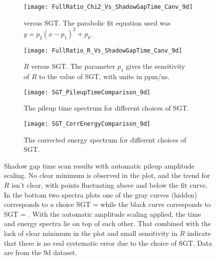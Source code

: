 \begin{figure}
\centering
    \begin{subfigure}[t]{0.45\textwidth}
        \centering
        \texttt{[image: FullRatio\_Chi2\_Vs\_ShadowGapTime\_Canv\_9d]}
        \caption{\chisq versus SGT. The parabolic fit equation used was $y = p_{2}(x - p_{1})^{2} + p_{0}.$}
    \end{subfigure}%
    \hspace{1cm}
    \begin{subfigure}[t]{0.45\textwidth}
        \centering
        \texttt{[image: FullRatio\_R\_Vs\_ShadowGapTime\_Canv\_9d]}
        \caption{$R$ versus SGT. The parameter $p_{1}$ gives the sensitivity of $R$ to the value of SGT, with units in ppm/ns.}
    \end{subfigure}

    \begin{subfigure}[t]{0.45\textwidth}
        \centering
        \texttt{[image: SGT\_PileupTimeComparison\_9d]}
        \caption{The pileup time spectrum for different choices of SGT.}
    \end{subfigure}%
    \hspace{1cm}
    \begin{subfigure}[t]{0.45\textwidth}
        \centering
        \texttt{[image: SGT\_CorrEnergyComparison\_9d]}
        \caption{The corrected energy spectrum for different choices of SGT.}
    \end{subfigure}
\caption[Pileup shadow gap time scan with automatic pileup amplitude scaling]{Shadow gap time scan results with automatic pileup amplitude scaling. No clear minimum is observed in the \chisq plot, and the trend for $R$ isn't clear, with points fluctuating above and below the fit curve. In the bottom two spectra plots one of the gray curves (hidden) corresponds to a choice SGT =  while the black curve corresponds to SGT = . With the automatic amplitude scaling applied, the time and energy spectra lie on top of each other. That combined with the lack of clear minimum in the \chisq plot and small sensitivity in $R$ indicate that there is no real systematic error due to the choice of SGT. Data are from the 9d dataset.}
\label{fig:SGTscan}
\end{figure}


